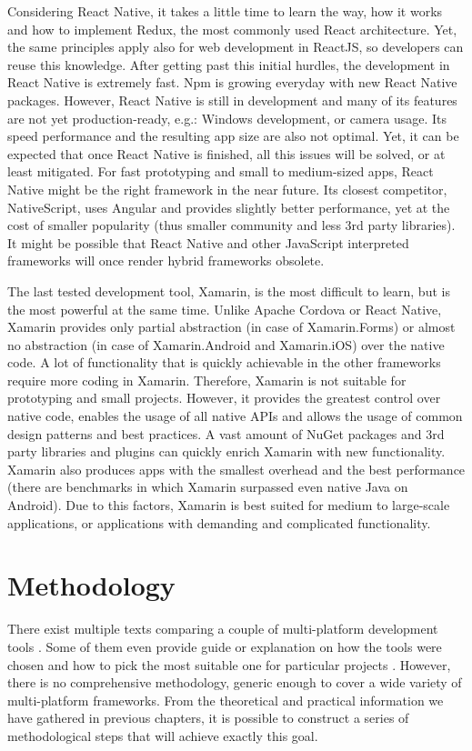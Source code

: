 \documentclass[english,master,public,dept460,male,cpdeclaration,oneside]{diploma}
\begin{document}
Considering React Native, it takes a little time to learn the way, how it works and how to implement Redux, the most commonly used React architecture. Yet, the same principles apply also for web development in ReactJS, so developers can reuse this knowledge. After getting past this initial hurdles, the development in React Native is extremely fast. Npm is growing everyday with new React Native packages. However, React Native is still in development and many of its features are not yet production-ready, e.g.: Windows development, or camera usage. Its speed performance and the resulting app size are also not optimal. Yet, it can be expected that once React Native is finished, all this issues will be solved, or at least mitigated. For fast prototyping and small to medium-sized apps, React Native might be the right framework in the near future. Its closest competitor, NativeScript, uses Angular and provides slightly better performance, yet at the cost of smaller popularity (thus smaller community and less 3rd party libraries). It might be possible that React Native and other JavaScript interpreted frameworks will once render hybrid frameworks obsolete.

The last tested development tool, Xamarin, is the most difficult to learn, but is the most powerful at the same time. Unlike Apache Cordova or React Native, Xamarin provides only partial abstraction (in case of Xamarin.Forms) or almost no abstraction (in case of Xamarin.Android and Xamarin.iOS) over the native code. A lot of functionality that is quickly achievable in the other frameworks require more coding in Xamarin. Therefore, Xamarin is not suitable for prototyping and small projects. However, it provides the greatest control over native code, enables the usage of all native APIs and allows the usage of common design patterns and best practices. A vast amount of NuGet packages and 3rd party libraries and plugins can quickly enrich Xamarin with new functionality. Xamarin also produces apps with the smallest overhead and the best performance (there are benchmarks in which Xamarin surpassed even native Java on Android). Due to this factors, Xamarin is best suited for medium to large-scale applications, or applications with demanding and complicated functionality.



\section{Methodology}

There exist multiple texts comparing a couple of multi-platform development tools \cite{aarhus} \cite{uppsala} \cite{taxonomyCP}. Some of them even provide guide or explanation on how the tools were chosen and how to pick the most suitable one for particular projects \cite{rhoMobile} \cite{aComparativeStudy}. However, there is no comprehensive methodology, generic enough to cover a wide variety of multi-platform frameworks. From the theoretical and practical information we have gathered in previous chapters, it is possible to construct a series of methodological steps that will achieve exactly this goal.
\end{document}
